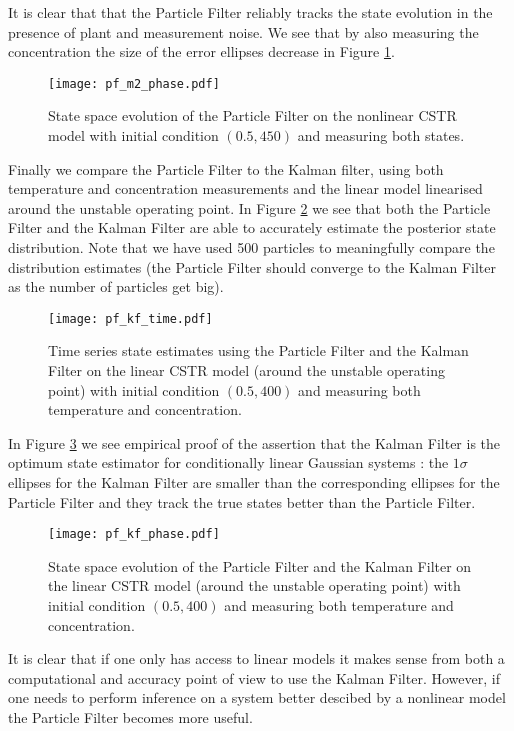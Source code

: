 It is clear that that the Particle Filter reliably tracks the state evolution in the presence of plant and measurement noise. We see that by also measuring the concentration the size of the error ellipses decrease in Figure \ref{fig_pf_m2_phase}. 
\begin{figure}[H] 
\centering
\texttt{[image: pf\_m2\_phase.pdf]}
\caption{State space evolution of the Particle Filter on the nonlinear CSTR model with initial condition $(0.5, 450)$ and measuring both states.}
\label{fig_pf_m2_phase}
\end{figure}
Finally we compare the Particle Filter to the Kalman filter, using both temperature and concentration measurements and the linear model linearised around the unstable operating point. In Figure \ref{fig_pf_kf_time} we see that both the Particle Filter and the Kalman Filter are able to accurately estimate the posterior state distribution. Note that we have used 500 particles to meaningfully compare the distribution estimates (the Particle Filter should converge to the Kalman Filter as the number of particles get big).
\begin{figure}[H] 
\centering
\texttt{[image: pf\_kf\_time.pdf]}
\caption{Time series state estimates using the Particle Filter and the Kalman Filter on the linear CSTR model (around the unstable operating point) with initial condition $(0.5, 400)$ and measuring both temperature and concentration.}
\label{fig_pf_kf_time}
\end{figure}
In Figure \ref{fig_pf_kf_phase} we see empirical proof of the assertion that the Kalman Filter is the optimum state estimator for conditionally linear Gaussian systems \cite{shalom}: the $1\sigma$ ellipses for the Kalman Filter are smaller than the corresponding ellipses for the Particle Filter and they track the true states better than the Particle Filter. 
\begin{figure}[H] 
\centering
\texttt{[image: pf\_kf\_phase.pdf]}
\caption{State space evolution of the Particle Filter and the Kalman Filter on the linear CSTR model (around the unstable operating point) with initial condition $(0.5, 400)$ and measuring both temperature and concentration.}
\label{fig_pf_kf_phase}
\end{figure}
It is clear that if one only has access to linear models it makes sense from both a computational and accuracy point of view to use the Kalman Filter. However, if one needs to perform inference on a system better descibed by a nonlinear model the Particle Filter becomes more useful.
